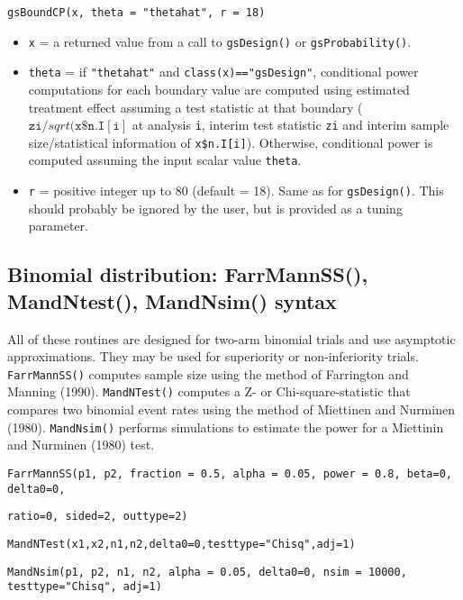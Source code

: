 \bigskip

\texttt{gsBoundCP(x, theta = "thetahat", r = 18)}

\begin{itemize}
\item \texttt{x} = a returned value from a call to \texttt{gsDesign()} or
\texttt{gsProbability()}.

\item \texttt{theta} = 
if \texttt{"thetahat"} and
\texttt{class(x)=="gsDesign"}, conditional power computations for each
boundary value are computed using estimated treatment effect assuming a test
statistic at that boundary ($\mathtt{zi}/sqrt(\mathtt{x\$n.I[i]}$ at analysis 
\texttt{i}, interim test
statistic \texttt{zi} and interim sample size/statistical information of 
\texttt{x\$n.I[i]}).
Otherwise, conditional power is computed assuming the input scalar value 
\texttt{theta}.

\item \texttt{r} = positive integer up to 80 (default = 18). Same as for
\texttt{gsDesign()}. This should probably be ignored by the user, but is
provided as a tuning parameter.
\end{itemize}

\subsection{Binomial distribution: FarrMannSS(), MandNtest(), MandNsim()
syntax}

All of these routines are designed for two-arm binomial trials and use
asymptotic approximations. They may be used for superiority or non-inferiority
trials. \texttt{FarrMannSS()} computes sample size using the method of
Farrington and Manning (1990). \texttt{MandNTest()} computes a Z- or
Chi-square-statistic that compares two binomial event rates using the method
of Miettinen and Nurminen (1980). \texttt{MandNsim()} performs simulations to
estimate the power for a Miettinin and Nurminen (1980) test.

\bigskip

\texttt{FarrMannSS(p1, p2, fraction = 0.5, alpha = 0.05, power = 0.8, beta=0,
delta0=0, }

\qquad\texttt{ratio=0, sided=2, outtype=2) }

\texttt{MandNTest(x1,x2,n1,n2,delta0=0,testtype="Chisq",adj=1)}

\texttt{MandNsim(p1, p2, n1, n2, alpha = 0.05, delta0=0, nsim = 10000,
testtype="Chisq", adj=1)}

